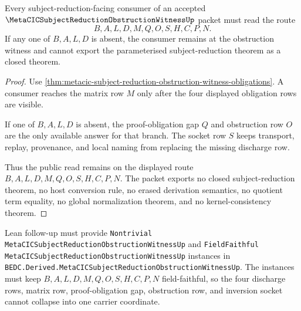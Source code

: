 \begin{theorem}
\label{thm:metacic-subject-reduction-obstruction-witness-nonescape}
Every subject-reduction-facing consumer of an accepted $\MetaCICSubjectReductionObstructionWitnessUp$ packet must read the route
$$
B,A,L,D,M,Q,O,S,H,C,P,N.
$$
If any one of $B,A,L,D$ is absent, the consumer remains at the obstruction witness and cannot export the parameterised subject-reduction theorem as a closed theorem.
\end{theorem}
\begin{proof}
Use \autoref{thm:metacic-subject-reduction-obstruction-witness-obligations}. A consumer reaches the matrix row $M$ only after the four displayed obligation rows are visible.

If one of $B,A,L,D$ is absent, the proof-obligation gap $Q$ and obstruction row $O$ are the only available answer for that branch. The socket row $S$ keeps transport, replay, provenance, and local naming from replacing the missing discharge row.

Thus the public read remains on the displayed route $B,A,L,D,M,Q,O,S,H,C,P,N$. The packet exports no closed subject-reduction theorem, no host conversion rule, no erased derivation semantics, no quotient term equality, no global normalization theorem, and no kernel-consistency theorem.
\end{proof}



Lean follow-up must provide \texttt{Nontrivial MetaCICSubjectReductionObstructionWitnessUp} and \texttt{FieldFaithful MetaCICSubjectReductionObstructionWitnessUp} instances in \texttt{BEDC.Derived.MetaCICSubjectReductionObstructionWitnessUp}. The instances must keep $B,A,L,D,M,Q,O,S,H,C,P,N$ field-faithful, so the four discharge rows, matrix row, proof-obligation gap, obstruction row, and inversion socket cannot collapse into one carrier coordinate.

